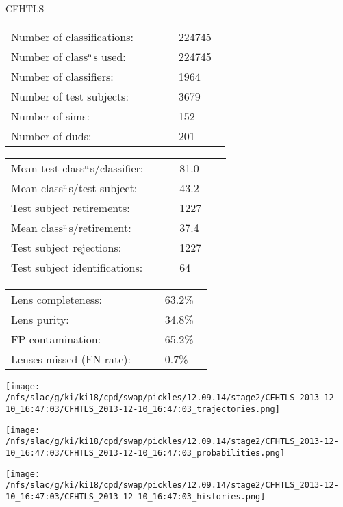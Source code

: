 \documentclass[letterpaper,12pt]{article}
\begin{document}
\begin{minipage}{0.42\linewidth}
{\LARGE CFHTLS}\newline
\medskip

\begin{tabular}{|p{0.65\linewidth}p{0.2\linewidth}|}
\hline
Number of classifications:         & 224745   \\ 
Number of class$^{\rm n}$s used:  & 224745   \\ 
Number of classifiers:             & 1964   \\ 
Number of test subjects:           & 3679   \\ 
Number of sims:                    & 152   \\ 
Number of duds:                    & 201   \\ 
\hline
\end{tabular}
\begin{tabular}{|p{0.65\linewidth}p{0.2\linewidth}|}
\hline
Mean test class$^{\rm n}$s/classifier: & 81.0 \\ 
Mean class$^{\rm n}$s/test subject:    & 43.2 \\ 
Test subject retirements:               & 1227   \\ 
Mean class$^{\rm n}$s/retirement:      & 37.4 \\ 
Test subject rejections:                & 1227   \\ 
Test subject identifications:           & 64   \\ 
\hline
\end{tabular}
\begin{tabular}{|p{0.65\linewidth}p{0.2\linewidth}|}
\hline
Lens completeness:         & 63.2\% \\ 
Lens purity:               & 34.8\% \\ 
FP contamination:          & 65.2\% \\ 
Lenses missed (FN rate):   & 0.7\% \\ 
\hline
\end{tabular}
\end{minipage}\hfill
\begin{minipage}{0.56\linewidth}
\texttt{[image: /nfs/slac/g/ki/ki18/cpd/swap/pickles/12.09.14/stage2/CFHTLS\_2013-12-10\_16:47:03/CFHTLS\_2013-12-10\_16:47:03\_trajectories.png]}
\end{minipage}

\vspace{-1\baselineskip}
\begin{minipage}{\linewidth}
\begin{minipage}{0.48\linewidth}
\texttt{[image: /nfs/slac/g/ki/ki18/cpd/swap/pickles/12.09.14/stage2/CFHTLS\_2013-12-10\_16:47:03/CFHTLS\_2013-12-10\_16:47:03\_probabilities.png]}
\end{minipage}
\begin{minipage}{0.48\linewidth}
\texttt{[image: /nfs/slac/g/ki/ki18/cpd/swap/pickles/12.09.14/stage2/CFHTLS\_2013-12-10\_16:47:03/CFHTLS\_2013-12-10\_16:47:03\_histories.png]}
\end{minipage}
\end{minipage}
\end{document}
